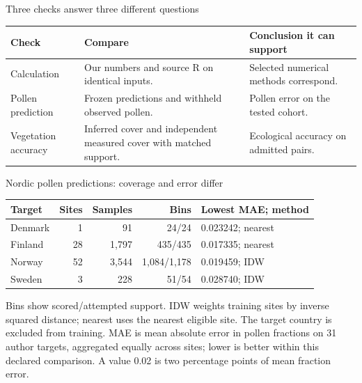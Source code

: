 \begin{frame}{Three checks answer three different questions}
\begin{tabular}{p{.25\linewidth}p{.34\linewidth}p{.29\linewidth}}
\toprule
Check & Compare & Conclusion it can support \\
\midrule
Calculation & Our numbers and source R on identical inputs. & Selected numerical methods correspond. \\
Pollen prediction & Frozen predictions and withheld observed pollen. & Pollen error on the tested cohort. \\
Vegetation accuracy & Inferred cover and independent measured cover with matched support. & Ecological accuracy on admitted pairs. \\
\bottomrule
\end{tabular}
\end{frame}

\begin{frame}{Nordic pollen predictions: coverage and error differ}
\small
\begin{tabular}{lrrrl}
\toprule
Target & Sites & Samples & Bins & Lowest MAE; method \\
\midrule
Denmark & 1 & 91 & 24/24 & 0.023242; nearest \\
Finland & 28 & 1,797 & 435/435 & 0.017335; nearest \\
Norway & 52 & 3,544 & 1,084/1,178 & 0.019459; IDW \\
Sweden & 3 & 228 & 51/54 & 0.028740; IDW \\
\bottomrule
\end{tabular}
\par\medskip
Bins show scored/attempted support. IDW weights training sites by inverse squared distance; nearest uses the nearest eligible site. The target country is excluded from training. MAE is mean absolute error in pollen fractions on 31 author targets, aggregated equally across sites; lower is better within this declared comparison. A value 0.02 is two percentage points of mean fraction error.
\end{frame}


